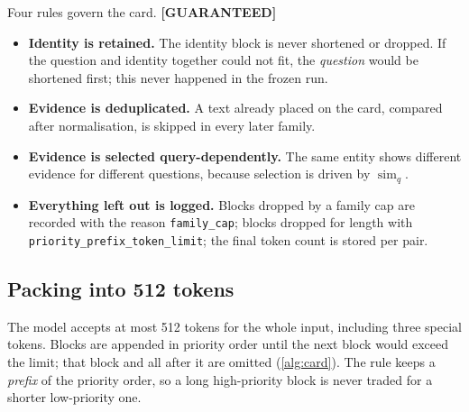 \documentclass[11pt,a4paper]{article}
\newcommand{\cref}[1]{\autoref{#1}}
\theoremstyle{remark}
\newcommand{\code}[1]{\texttt{\small #1}}
\DeclareMathOperator{\simop}{sim}
\newcommand{\vtag}[2]{{\sffamily\scriptsize\bfseries\textcolor{#1}{[#2]}}}
\newcommand{\Gtag}{\vtag{accent}{GUARANTEED}}
\begin{document}
Four rules govern the card. \Gtag
\begin{itemize}
  \item \textbf{Identity is retained.} The identity block is never shortened or dropped.
        If the question and identity together could not fit, the \emph{question} would be
        shortened first; this never happened in the frozen run.
  \item \textbf{Evidence is deduplicated.} A text already placed on the card, compared
        after normalisation, is skipped in every later family.
  \item \textbf{Evidence is selected query-dependently.} The same entity shows different
        evidence for different questions, because selection is driven by $\simop_q$.
  \item \textbf{Everything left out is logged.} Blocks dropped by a family cap are
        recorded with the reason \code{family\_cap}; blocks dropped for length with
        \code{priority\_prefix\_token\_limit}; the final token count is stored per pair.
\end{itemize}

\subsection{Packing into 512 tokens}

The model accepts at most 512 tokens for the whole input, including three special tokens.
Blocks are appended in priority order until the next block would exceed the limit; that
block and all after it are omitted (\cref{alg:card}). The rule keeps a \emph{prefix} of the
priority order, so a long high-priority block is never traded for a shorter low-priority
one.
\end{document}
